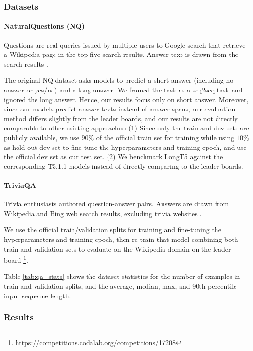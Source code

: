 \documentclass[11pt]{article}
\begin{document}
\subsubsection{Datasets}\label{subsec:qa-datasets}
\vspace{-1mm}
\paragraph{NaturalQuestions (NQ)} Questions are real queries issued by multiple users to Google search that retrieve a Wikipedia page in the top five search results. Answer text is drawn from the search results \cite{naturalquestions}.

The original NQ dataset asks models to predict a short answer (including no-answer or yes/no) and a long answer. We framed the task as a seq2seq task and ignored the long answer. Hence, our results focus only on short answer. Moreover, since our models predict answer texts instead of answer spans, our evaluation method differs slightly from the leader boards, and our results are not directly comparable to other existing approaches: (1) Since only the train and dev sets are publicly available, we use $90\%$ of the official train set for training while using $10\%$ as hold-out dev set to fine-tune the hyperparameters and training epoch, and use the official dev set as our test set. (2) We benchmark LongT5 against the corresponding T5.1.1 models instead of directly comparing to the leader boards.
\vspace{-1mm}
\paragraph{TriviaQA} Trivia enthusiasts authored question-answer pairs.
Answers are drawn from Wikipedia and Bing web search results, excluding trivia websites \cite{triviaqa}.

We use the official train/validation splits for training and fine-tuning the hyperparameters and training epoch, then re-train that model combining both train and validation sets to evaluate on the Wikipedia domain on the leader board \footnote{https://competitions.codalab.org/competitions/17208}.




Table \ref{tab:qa_stats} shows the dataset statistics for the number of examples in train and validation splits, and the average, median, max, and 90th percentile input sequence length.
\subsubsection{Results}
\end{document}
